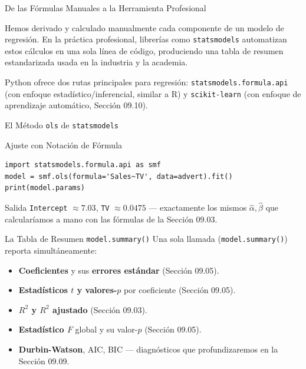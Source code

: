 \documentclass[10pt, aspectratio=169]{beamer}
\begin{document}
\begin{frame}{De las Fórmulas Manuales a la Herramienta Profesional}
  \footnotesize
  \begin{motivacion}
    Hemos derivado y calculado manualmente cada componente de un modelo de regresión. En la práctica profesional, librerías como \texttt{statsmodels} automatizan estos cálculos en una sola línea de código, produciendo una tabla de resumen estandarizada usada en la industria y la academia.
  \end{motivacion}

  \vspace{0.15cm}
  \pause
  Python ofrece dos rutas principales para regresión: \texttt{statsmodels.formula.api} (con enfoque estadístico/inferencial, similar a R) y \texttt{scikit-learn} (con enfoque de aprendizaje automático, Sección 09.10).
\end{frame}

\begin{frame}[fragile]{El Método \texttt{ols} de \texttt{statsmodels}}
  \footnotesize
  \begin{block}{Ajuste con Notación de Fórmula}
    \begin{verbatim}
import statsmodels.formula.api as smf
model = smf.ols(formula='Sales~TV', data=advert).fit()
print(model.params)
    \end{verbatim}
  \end{block}
  \pause

  \vspace{0.1cm}
  \begin{alertblock}{Salida}
    \texttt{Intercept} $\approx7.03$, \texttt{TV} $\approx0.0475$ --- exactamente los mismos $\hat\alpha,\hat\beta$ que calcularíamos a mano con las fórmulas de la Sección 09.03.
  \end{alertblock}
\end{frame}

\begin{frame}{La Tabla de Resumen \texttt{model.summary()}}
  \footnotesize
  Una sola llamada (\texttt{model.summary()}) reporta simultáneamente:
  \begin{itemize}\itemsep=0.08cm
    \item \textbf{Coeficientes} y sus \textbf{errores estándar} (Sección 09.05). \pause
    \item \textbf{Estadísticos $t$ y valores-$p$} por coeficiente (Sección 09.05). \pause
    \item \textbf{$R^2$ y $R^2$ ajustado} (Sección 09.03). \pause
    \item \textbf{Estadístico $F$} global y su valor-$p$ (Sección 09.05). \pause
    \item \textbf{Durbin-Watson}, AIC, BIC --- diagnósticos que profundizaremos en la Sección 09.09.
  \end{itemize}
\end{frame}
\end{document}
